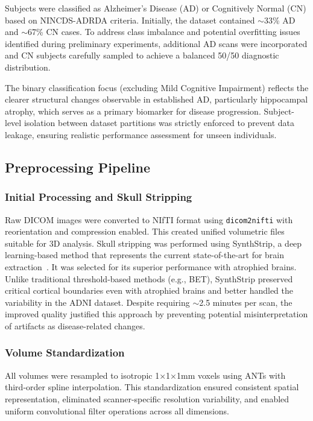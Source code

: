 \documentclass[12pt, a4paper]{article}
\begin{document}
Subjects were classified as Alzheimer's Disease (AD) or Cognitively Normal (CN) based on NINCDS-ADRDA criteria. Initially, the dataset contained $\sim$33\% AD and $\sim$67\% CN cases. To address class imbalance and potential overfitting issues identified during preliminary experiments, additional AD scans were incorporated and CN subjects carefully sampled to achieve a balanced 50/50 diagnostic distribution.

The binary classification focus (excluding Mild Cognitive Impairment) reflects the clearer structural changes observable in established AD, particularly hippocampal atrophy, which serves as a primary biomarker for disease progression. Subject-level isolation between dataset partitions was strictly enforced to prevent data leakage, ensuring realistic performance assessment for unseen individuals.

\subsection{Preprocessing Pipeline}

\subsubsection{Initial Processing and Skull Stripping}

Raw DICOM images were converted to NIfTI format using \texttt{dicom2nifti} with reorientation and compression enabled. This created unified volumetric files suitable for 3D analysis. Skull stripping was performed using SynthStrip, a deep learning-based method that represents the current state-of-the-art for brain extraction~\cite{hoopes2022synthstrip}. It was selected for its superior performance with atrophied brains. Unlike traditional threshold-based methods (e.g., BET), SynthStrip preserved critical cortical boundaries even with atrophied brains and better handled the variability in the ADNI dataset. Despite requiring $\sim$2.5 minutes per scan, the improved quality justified this approach by preventing potential misinterpretation of artifacts as disease-related changes.

\subsubsection{Volume Standardization}

All volumes were resampled to isotropic 1×1×1mm voxels using ANTs with third-order spline interpolation. This standardization ensured consistent spatial representation, eliminated scanner-specific resolution variability, and enabled uniform convolutional filter operations across all dimensions.
\end{document}
